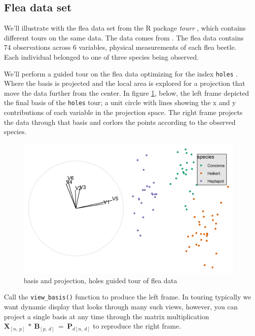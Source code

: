 \documentclass{monashthesis}
\begin{document}
\subsection{Flea data set}\label{flea-data-set}

We'll illustrate with the flea data set from the R package \emph{tourr}
\autocite{wickham_tourr_2011}, which contains different tours on the
same data. The data comes from \textcite{lubischew_use_1962}. The flea
data contains 74 observations across 6 variables, physical measurements
of each flea beetle. Each individual belonged to one of three species
being observed.

We'll perform a guided tour on the flea data optimizing for the index
\texttt{holes} \autocite{cook_interactive_2007}. Where the basis is
projected and the local area is explored for a projection that move the
data further from the center. In figure \ref{fig:step0}, below, the left
frame depicted the final basis of the \texttt{holes} tour; a unit circle
with lines showing the x and y contributions of each variable in the
projection space. The right frame projects the data through that basis
and corlors the points according to the observed species.

\begin{figure}
\includegraphics[width=6.71in]{./output/step0_basis+proj} \caption{basis and projection, holes guided tour of flea data}\label{fig:step0}
\end{figure}

Call the \texttt{view\_basis()} function to produce the left frame. In
touring typically we want dynamic display that looks through many such
views, however, you can project a single basis at any time through the
matrix multiplication
\(\textbf{X}_{[n,~p]} ~*~ \textbf{B}_{[p,~d]} ~=~ \textbf{P}_{d[n,~d]}\)
to reproduce the right frame.
\end{document}
